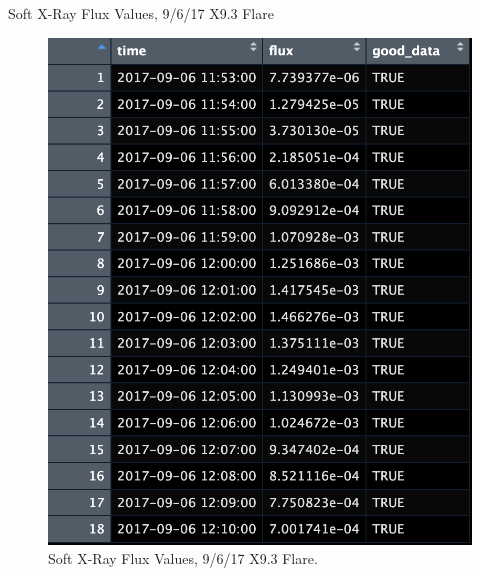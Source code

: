 \documentclass{beamer}
\begin{document}
\begin{frame}{Soft X-Ray Flux Values, 9/6/17 X9.3 Flare}
    \begin{figure}
        \centering
        \includegraphics[scale=0.4]{flux_vals_20170906.png}
        \caption{Soft X-Ray Flux Values, 9/6/17 X9.3 Flare.}
        \label{fig:flux_vals_20170906}
    \end{figure}
\end{frame}
\end{document}
